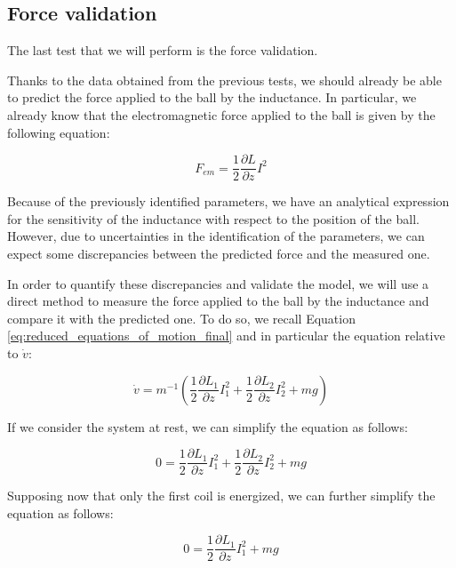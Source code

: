 \subsection{Force validation}
\label{subsec:force_validation}

The last test that we will perform is the force validation.

Thanks to the data obtained from the previous tests, we should already be able to predict the force applied to the ball by the inductance.
In particular, we already know that the electromagnetic force applied to the ball is given by the following equation:

\begin{equation}
    F_{em} = \frac{1}{2} \frac{\partial L}{\partial z} I^2
\end{equation}

Because of the previously identified parameters, we have an analytical expression for the sensitivity of the inductance with respect to the position of the ball.
However, due to uncertainties in the identification of the parameters, we can expect some discrepancies between the predicted force and the measured one.

In order to quantify these discrepancies and validate the model, we will use a direct method to measure the force applied to the ball by the inductance and compare it with the predicted one.
To do so, we recall Equation \ref{eq:reduced_equations_of_motion_final} and in particular the equation relative to $\dot{v}$:

\begin{equation}
    \dot{v} = m^{-1} \left(\frac{1}{2} \frac{\partial L_1}{\partial z} I_1^2 + \frac{1}{2} \frac{\partial L_2}{\partial z} I_2^2 + m g  \right)
\end{equation}

If we consider the system at rest, we can simplify the equation as follows:

\begin{equation}
    0 = \frac{1}{2} \frac{\partial L_1}{\partial z} I_1^2 + \frac{1}{2} \frac{\partial L_2}{\partial z} I_2^2 + m g
\end{equation}

Supposing now that only the first coil is energized, we can further simplify the equation as follows:

\begin{equation}
    0 = \frac{1}{2} \frac{\partial L_1}{\partial z} I_1^2 + m g
\end{equation}

